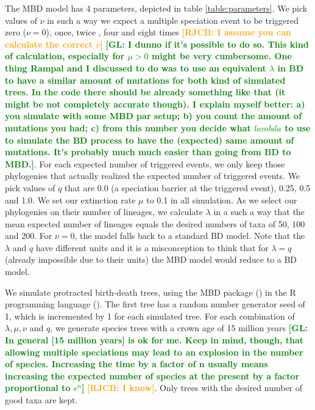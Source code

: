 \documentclass{article}
\newcommand*\richel[1]{\textcolor{orange}{\textbf{[RJCB: #1]}}}
\newcommand*\gio[1]{\textcolor{green}{\textbf{[GL: #1]}}}
\begin{document}

The MBD model has 4 parameters, depicted in table \ref{table:parameters}. 
We pick values of $\nu$ in such a way we expect a multiple speciation
event to be triggered zero ($\nu = 0$), once, twice , four and eight times 
\richel{I assume you can calculate the correct $\nu$} \gio{I dunno if it's possible to do so. This kind of calculation, especially for $\mu>0$ might be very cumbersome. One thing Rampal and I discussed to do was to use an equivalent $\lambda$ in BD to have a similar amount of mutations for both kind of simulated trees. In the code there should be already something like that (it might be not completely accurate though). I explain myself better: a) you simulate with some MBD par setup; b) you count the amount of mutations you had; c) from this number you decide what $lambda$ to use to simulate the BD process to have the (expected) same amount of mutations. It's probably much much easier than going from BD to MBD.}. For each
expected number of triggered events, we only keep those phylogenies
that actually realized the expected number of triggered events.
We pick values of $q$ that are 0.0 (a speciation barrier at the
triggered event), 0.25, 0.5 and 1.0.
We set our extinction rate $\mu$ to 0.1 in all simulation.
As we select our phylogenies on their number of lineages,
we calculate $\lambda$ in a such a way that the mean expected number
of lineages equals the desired numbers of taxa of 50, 100 and 200. 
For $\nu = 0$, the model falls back to a standard BD model.
Note that the $\lambda$ and $q$ have different units
and it is a misconception to think that for $\lambda = q$ (already
impossible due to their units) the MBD model would reduce to a BD model.

We simulate protracted birth-death trees, using the MBD package (\cite{mbd}) in the R programming language (\cite{r}).
The first tree has a random number generator seed of 1, which is incremented by 1 for each simulated tree.
For each combination of $\lambda, \mu, \nu$ and $q$, 
we generate species trees with a crown age of 15 million years 
\gio{In general [15 million years] is ok for me. Keep in mind, though, that allowing multiple speciations may lead to an explosion in the number of species. Increasing the time by a factor of n usually means increasing the expected number of species at the present by a factor proportional to $e^n$}
\richel{I know}.
Only trees with the desired number of good taxa are kept.
\end{document}
